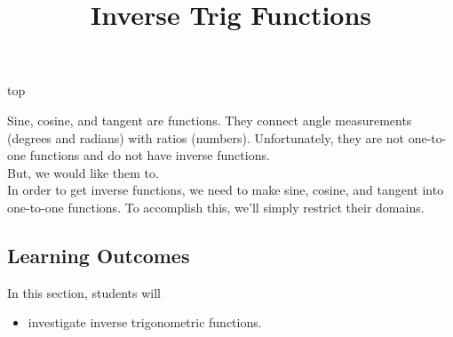 \documentclass{ximera}
\title{Inverse Trig Functions}
\begin{document}
\begin{abstract}
%
\end{abstract}
\maketitle


top


Sine, cosine, and tangent are functions. They connect angle measurements (degrees and radians) with ratios (numbers). Unfortunately, they are not one-to-one functions and do not have inverse functions. \\

But, we would like them to.\\

In order to get inverse functions, we need to make sine, cosine, and tangent into one-to-one functions.  To accomplish this, we'll simply restrict their domains.














\subsection{Learning Outcomes}

\begin{sectionOutcomes}
In this section, students will 

\begin{itemize}
\item investigate inverse trigonometric functions.
\end{itemize}
\end{sectionOutcomes}
\end{document}
